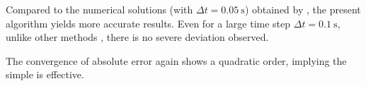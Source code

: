 Compared to the numerical solutions (with $\Delta{}t=\SI{0.05}{\second}$) obtained by \citet{Cortes2009}, the present algorithm yields more accurate results. Even for a large time step $\Delta{}t=\SI{0.1}{\second}$, unlike other methods \citep{Liu2023}, there is no severe deviation observed.

The convergence of absolute error again shows a quadratic order, implying the simple  is effective.
